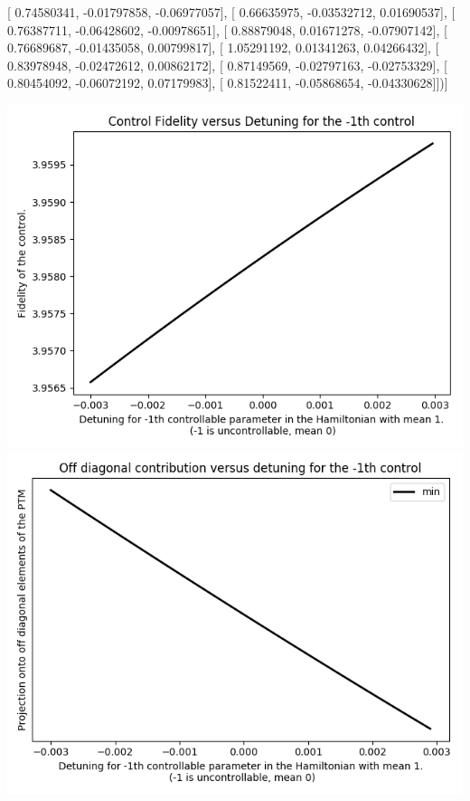 \documentclass{article}
\begin{document}
       [ 0.74580341, -0.01797858, -0.06977057],
       [ 0.66635975, -0.03532712,  0.01690537],
       [ 0.76387711, -0.06428602, -0.00978651],
       [ 0.88879048,  0.01671278, -0.07907142],
       [ 0.76689687, -0.01435058,  0.00799817],
       [ 1.05291192,  0.01341263,  0.04266432],
       [ 0.83978948, -0.02472612,  0.00862172],
       [ 0.87149569, -0.02797163, -0.02753329],
       [ 0.80454092, -0.06072192,  0.07179983],
       [ 0.81522411, -0.05868654, -0.04330628]])]
\begin{center}
\includegraphics[scale=.9]{control_fid_0}
\includegraphics[scale=.9]{off_diag_0}

\end{center}
\end{document}
